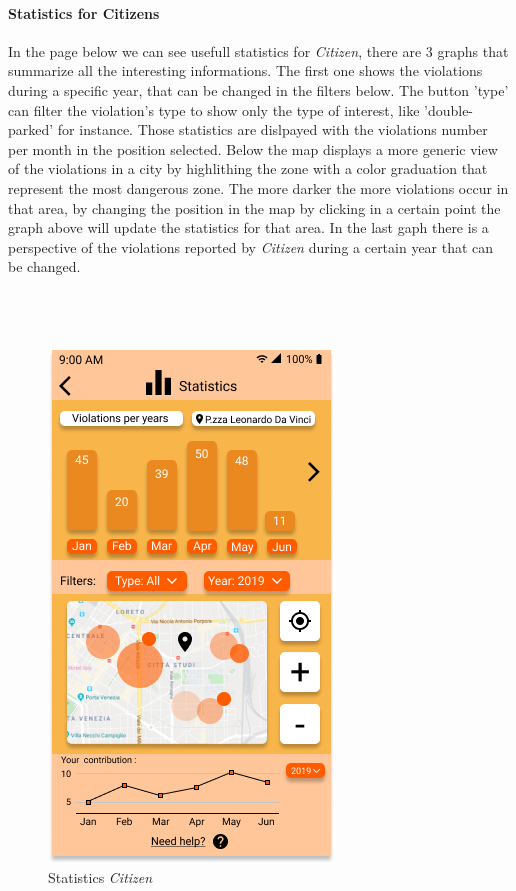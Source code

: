 \documentclass{article}
\begin{document}
\paragraph{Statistics for Citizens}
In the page below we can see usefull statistics for \textit{Citizen}, there are 3 graphs that summarize all the interesting
informations. The first one shows the violations during a specific year, that can be changed in the filters below. 
The button 'type' can filter the violation's type to show only the type of interest, like 'double-parked' for instance. 
Those statistics are dislpayed with the violations number per month in the position selected. Below the map displays
a more generic view of the violations in a city by highlithing the zone with a color graduation that represent the most
dangerous zone. The more darker the more violations occur in that area, by changing the position in the map by clicking 
in a certain point the graph above will update the statistics for that area.  In the last gaph there is a perspective of 
the violations reported by \textit{Citizen} during a certain year that can be changed.
\\
\\
\\
\\
\begin{figure}[H]
    \centering
    \includegraphics[scale=0.5]{img/mockups/statistics_citizen.png}
    \caption{Statistics \textit{Citizen}}
\end{figure}
\end{document}

